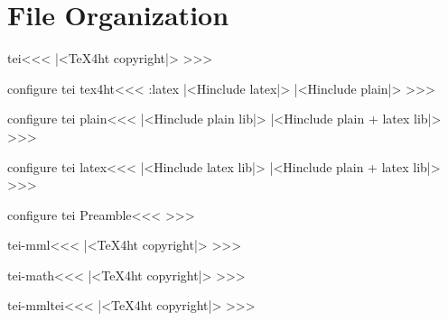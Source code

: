 \chapter{File Organization}

\<tei\><<<
|<TeX4ht copyright|>
>>>

\<configure tei tex4ht\><<<
\if:latex  |<Hinclude latex|>
\else      |<Hinclude plain|>  \fi
>>>

\<configure tei plain\><<<
|<Hinclude plain lib|>
|<Hinclude plain + latex lib|>
>>>

\<configure tei latex\><<<
|<Hinclude latex lib|>
|<Hinclude plain + latex lib|>
>>>

\<configure tei Preamble\><<<    
\edef\Preamble{\Preamble,refcaption}
>>>

\<tei-mml\><<<
|<TeX4ht copyright|>
>>>


\<tei-math\><<<
|<TeX4ht copyright|>
>>>


\<tei-mmltei\><<<
|<TeX4ht copyright|>
>>>



